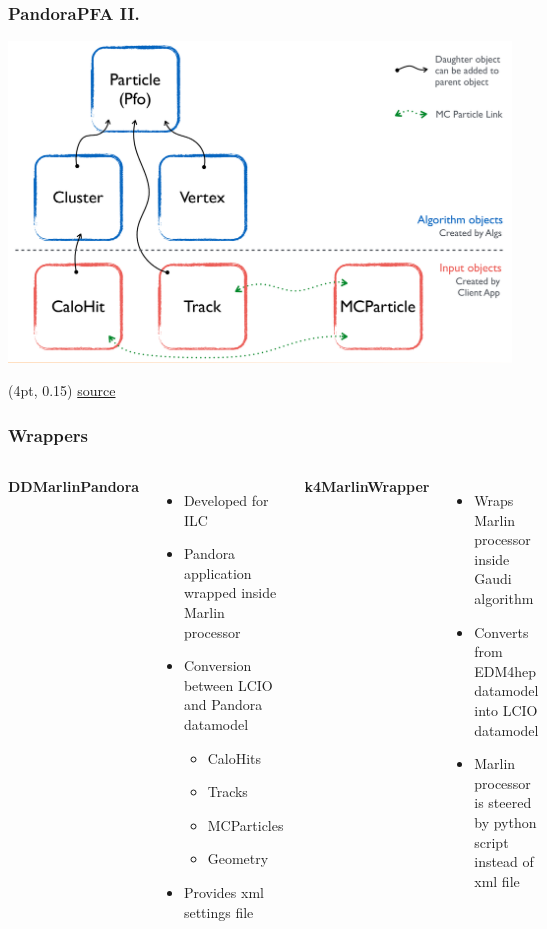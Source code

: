 \documentclass[aspectratio=169]{beamer}
\newcommand{\bluetext}[1]{%
  \textcolor{myBlue}{#1}
}
\begin{document}
\begin{frame}
  \frametitle{PandoraPFA II.}

  \begin{center}
    \includegraphics[width=.8\textwidth]{figures/pandora_edm.pdf}
  \end{center}

  \begin{textblock*}{\paperwidth}(4pt, 0.15\textheight)
    \tiny
    \href{https://github.com/PandoraPFA/Documentation/blob/master/Pandora_Example.pdf}
         {source}
  \end{textblock*}
\end{frame}


\begin{frame}
  \frametitle{Wrappers}

  \begin{columns}[c]

    \bluetext{\bf DDMarlinPandora}

    \begin{itemize}
      \item Developed for ILC
      \item Pandora application wrapped inside Marlin processor
      \item Conversion between LCIO and Pandora datamodel
            \begin{itemize}
              \item CaloHits
              \item Tracks
              \item MCParticles
              \item Geometry
            \end{itemize}
      \item Provides xml settings file
    \end{itemize}


    \bluetext{\bf k4MarlinWrapper}
    \begin{itemize}
      \item Wraps Marlin processor inside Gaudi algorithm
      \item Converts from EDM4hep datamodel into LCIO datamodel
      \item Marlin processor is steered by python script instead of xml file
    \end{itemize}
  \end{columns}
\end{frame}
\end{document}
